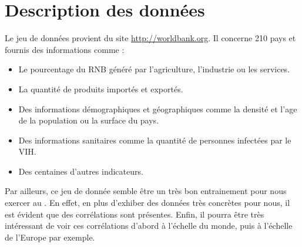 \section{Description des données}
Le jeu de données provient du site \url{http://worldbank.org}. Il concerne 210 pays et fournis des informations comme :
\begin{itemize}
	\item Le pourcentage du \gls{RNB} généré par l'agriculture, l'industrie ou les services.
	\item La quantité de produits importés et exportés.
	\item Des informations démographiques et géographiques comme la densité et l'age de la population ou la surface du pays.
	\item Des informations sanitaires comme la quantité de personnes infectées par le \gls{VIH}.
	\item Des centaines d'autres indicateurs.
\end{itemize}
Par ailleurs, ce jeu de donnée semble être un très bon entrainement pour nous exercer au . En effet, en plus d'exhiber des données très concrètes pour nous, il est évident que des corrélations sont présentes. Enfin, il pourra être très intéressant de voir ces corrélations d'abord à l'échelle du monde, puis à l'échelle de l'Europe par exemple. 

